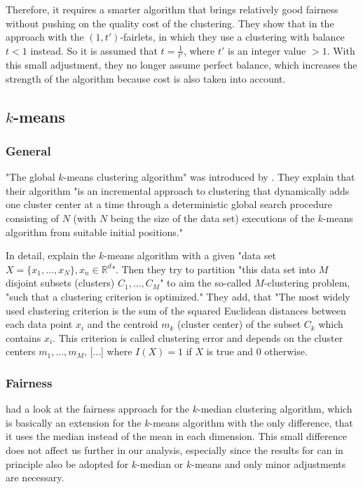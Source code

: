 Therefore, it requires a smarter algorithm that brings relatively good fairness without pushing on the quality cost of the clustering. They show that in the approach with the $(1,t')$-fairlets, in which they use a clustering with balance $t < 1$ instead. So it is assumed that $t = \frac{1}{t'}$, where $t'$ is an integer value $> 1$. \autocite[6]{Chierichetti2018} With this small adjustment, they no longer assume perfect balance, which increases the strength of the algorithm because cost is also taken into account.


\subsection{$k$-means}
\label{k-means}

\subsubsection{General}

"The global $k$-means clustering algorithm" was introduced by \textcite[]{Likas2003}. They explain that their algorithm "is an incremental approach to clustering that dynamically adds one cluster center at a time through a deterministic global search procedure consisting of $N$ (with $N$ being the size of the data set) executions of the $k$-means algorithm from suitable initial positions." \autocite[1]{Likas2003}

In detail, \textcite[2]{Likas2003} explain the $k$-means algorithm with a given "data set $X = \{x_{1},...,x_{N}\},x_{n} \in \mathbb{R}^d$". Then they try to partition "this data set into $M$ disjoint subsets (clusters) $C_{1},...,C_{M}$" to aim the so-called $M$-clustering problem, "such that a clustering criterion is optimized." They add, that "The most widely used clustering criterion is the sum of the squared Euclidean distances between each data point $x_{i}$ and the centroid $m_{k}$ (cluster center) of the subset $C_{k}$ which contains $x_{i}$. This criterion is called clustering error and depends on the cluster centers $m_{1},...,m_{M}$, [...] where $I(X) = 1$ if $X$ is true and $0$ otherwise.

\subsubsection{Fairness}

\textcite[]{Chierichetti2018} had a look at the fairness approach for the $k$-median clustering algorithm, which is basically an extension for the $k$-means algorithm with the only difference, that it uses the median instead of the mean in each dimension. \autocite[]{Jain1988} This small difference does not affect us further in our analysis, especially since the results for  can in principle also be adopted for $k$-median or $k$-means and only minor adjustments are necessary.

